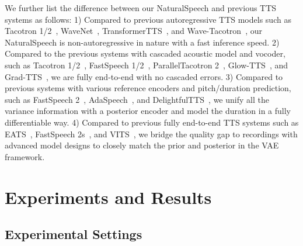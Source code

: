 \documentclass{article}
\theoremstyle{definition}
\def\myname{NaturalSpeech}
\begin{document}
We further list the difference between our \myname{} and previous TTS systems as follows: 1) Compared to previous autoregressive TTS models such as Tacotron 1/2~\citep{wang2017tacotron,shen2018natural}, WaveNet~\citep{oord2016wavenet}, TransformerTTS~\citep{li2019neural}, and Wave-Tacotron~\cite{weiss2021wave}, our \myname{} is non-autoregressive in nature with a fast inference speed. 2) Compared to the previous systems with cascaded acoustic model and vocoder, such as Tacotron 1/2~\citep{wang2017tacotron,shen2018natural}, FastSpeech 1/2~\citep{ren2019fastspeech,ren2021fastspeech}, ParallelTacotron 2~\citep{elias2021parallel}, Glow-TTS~\citep{kim2020glow}, and Grad-TTS~\citep{popov2021grad}, we are fully end-to-end with no cascaded errors. 3) Compared to previous systems with various reference encoders and pitch/duration prediction, such as FastSpeech 2~\citep{ren2021fastspeech}, AdaSpeech~\citep{chen2021adaspeech}, and DelightfulTTS~\citep{liu2021delightfultts}, we unify all the variance information with a posterior encoder and model the duration in a fully differentiable way. 4) Compared to previous fully end-to-end TTS systems such as EATS~\citep{donahue2020end}, FastSpeech 2s~\citep{ren2021fastspeech}, and VITS~\citep{kim2021conditional}, we bridge the quality gap to recordings with advanced model designs to closely match the prior and posterior in the VAE framework. 






\section{Experiments and Results}

\subsection{Experimental Settings}
\label{sec_exp_setting}
\end{document}
